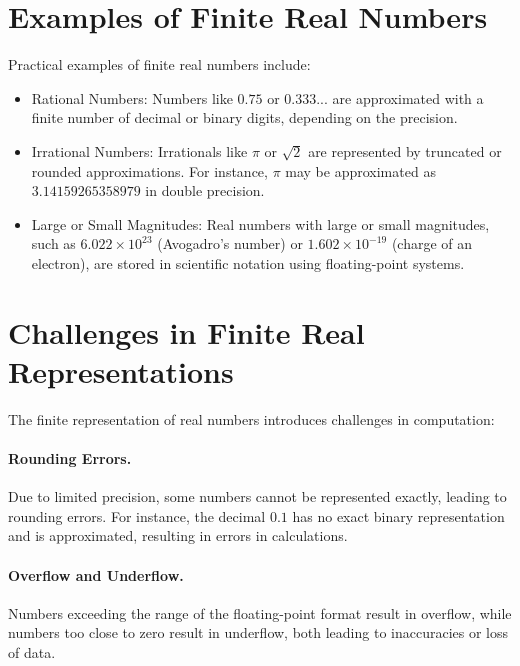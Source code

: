 \section{Examples of Finite Real Numbers}

Practical examples of finite real numbers include:
\begin{itemize}
    \item Rational Numbers: Numbers like \( 0.75 \) or \( 0.333... \) are approximated with a finite number of decimal or binary digits, depending on the precision.
    \item Irrational Numbers: Irrationals like \( \pi \) or \( \sqrt{2} \) are represented by truncated or rounded approximations. For instance, \( \pi \) may be approximated as \( 3.14159265358979 \) in double precision.
    \item Large or Small Magnitudes: Real numbers with large or small magnitudes, such as \( 6.022 \times 10^{23} \) (Avogadro's number) or \( 1.602 \times 10^{-19} \) (charge of an electron), are stored in scientific notation using floating-point systems.
\end{itemize}

\section{Challenges in Finite Real Representations}
The finite representation of real numbers introduces challenges in computation:

\paragraph{Rounding Errors.}
Due to limited precision, some numbers cannot be represented exactly, leading to rounding errors. For instance, the decimal \( 0.1 \) has no exact binary representation and is approximated, resulting in errors in calculations.

\paragraph{Overflow and Underflow.}
Numbers exceeding the range of the floating-point format result in overflow, while numbers too close to zero result in underflow, both leading to inaccuracies or loss of data.

